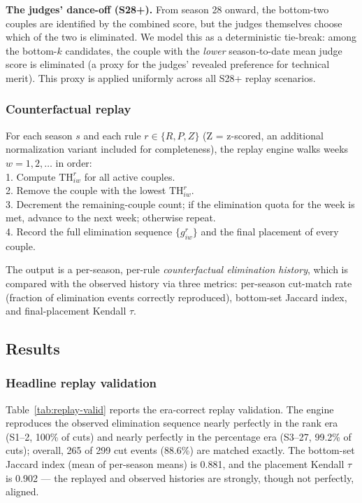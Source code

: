 \documentclass[10pt]{article}
\begin{document}
\textbf{The judges' dance-off (S28+).} From season 28 onward, the bottom-two couples are
identified by the combined score, but the judges themselves choose which of the two is
eliminated. We model this as a deterministic tie-break: among the bottom-$k$ candidates,
the couple with the \emph{lower} season-to-date mean judge score is eliminated
(a proxy for the judges' revealed preference for technical merit). This proxy is applied
uniformly across all S28+ replay scenarios.

\subsubsection{Counterfactual replay}

For each season $s$ and each rule $r \in \{R, P, Z\}$ (Z = z-scored, an additional
normalization variant included for completeness), the replay engine walks weeks
$w = 1, 2, \ldots$ in order:\\
\hspace*{1em}1. Compute $\mathrm{TH}^{r}_{iw}$ for all active couples.\\
\hspace*{1em}2. Remove the couple with the lowest $\mathrm{TH}^{r}_{iw}$.\\
\hspace*{1em}3. Decrement the remaining-couple count; if the elimination quota for the
week is met, advance to the next week; otherwise repeat.\\
\hspace*{1em}4. Record the full elimination sequence $\{g^{r}_{iw}\}$ and the final
placement of every couple.

The output is a per-season, per-rule \emph{counterfactual elimination history}, which is
compared with the observed history via three metrics: per-season cut-match rate (fraction
of elimination events correctly reproduced), bottom-set Jaccard index, and final-placement
Kendall $\tau$.

\subsection{Results}
\label{sec:m2results}

\subsubsection{Headline replay validation}

Table~\ref{tab:replay-valid} reports the era-correct replay validation. The engine
reproduces the observed elimination sequence nearly perfectly in the rank era (S1--2,
100\% of cuts) and nearly perfectly in the percentage era (S3--27, 99.2\% of cuts); overall,
265 of 299 cut events (88.6\%) are matched exactly. The bottom-set Jaccard index (mean of
per-season means) is 0.881, and the placement Kendall $\tau$ is 0.902 --- the replayed and
observed histories are strongly, though not perfectly, aligned.
\end{document}
